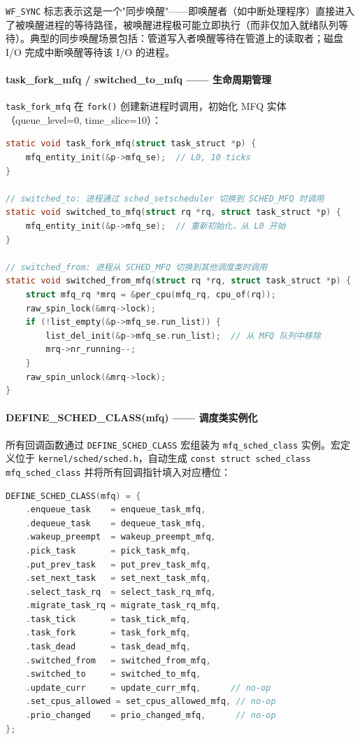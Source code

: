 \documentclass[a4paper]{article}
\begin{document}
\texttt{WF\_SYNC} 标志表示这是一个"同步唤醒"——即唤醒者（如中断处理程序）直接进入了被唤醒进程的等待路径，被唤醒进程极可能立即执行（而非仅加入就绪队列等待）。典型的同步唤醒场景包括：管道写入者唤醒等待在管道上的读取者；磁盘 I/O 完成中断唤醒等待该 I/O 的进程。

\paragraph{task\_fork\_mfq / switched\_to\_mfq —— 生命周期管理}

\texttt{task\_fork\_mfq} 在 \texttt{fork()} 创建新进程时调用，初始化 MFQ 实体（queue\_level=0, time\_slice=10）：

\begin{lstlisting}[language=C, caption={task\_fork / switched\_to / switched\_from（kernel/sched/sched\_mfq.c）}, label={lst:mfq_lifecycle}]
static void task_fork_mfq(struct task_struct *p) {
    mfq_entity_init(&p->mfq_se);  // L0, 10 ticks
}

// switched_to: 进程通过 sched_setscheduler 切换到 SCHED_MFQ 时调用
static void switched_to_mfq(struct rq *rq, struct task_struct *p) {
    mfq_entity_init(&p->mfq_se);  // 重新初始化，从 L0 开始
}

// switched_from: 进程从 SCHED_MFQ 切换到其他调度类时调用
static void switched_from_mfq(struct rq *rq, struct task_struct *p) {
    struct mfq_rq *mrq = &per_cpu(mfq_rq, cpu_of(rq));
    raw_spin_lock(&mrq->lock);
    if (!list_empty(&p->mfq_se.run_list)) {
        list_del_init(&p->mfq_se.run_list);  // 从 MFQ 队列中移除
        mrq->nr_running--;
    }
    raw_spin_unlock(&mrq->lock);
}
\end{lstlisting}

\paragraph{DEFINE\_SCHED\_CLASS(mfq) —— 调度类实例化}

所有回调函数通过 \texttt{DEFINE\_SCHED\_CLASS} 宏组装为 \texttt{mfq\_sched\_class} 实例。宏定义位于 \texttt{kernel/sched/sched.h}，自动生成 \texttt{const struct sched\_class mfq\_sched\_class} 并将所有回调指针填入对应槽位：

\begin{lstlisting}[language=C, caption={DEFINE\_SCHED\_CLASS(mfq) 实例化（kernel/sched/sched\_mfq.c）}, label={lst:mfq_define}]
DEFINE_SCHED_CLASS(mfq) = {
    .enqueue_task    = enqueue_task_mfq,
    .dequeue_task    = dequeue_task_mfq,
    .wakeup_preempt  = wakeup_preempt_mfq,
    .pick_task       = pick_task_mfq,
    .put_prev_task   = put_prev_task_mfq,
    .set_next_task   = set_next_task_mfq,
    .select_task_rq  = select_task_rq_mfq,
    .migrate_task_rq = migrate_task_rq_mfq,
    .task_tick       = task_tick_mfq,
    .task_fork       = task_fork_mfq,
    .task_dead       = task_dead_mfq,
    .switched_from   = switched_from_mfq,
    .switched_to     = switched_to_mfq,
    .update_curr     = update_curr_mfq,      // no-op
    .set_cpus_allowed = set_cpus_allowed_mfq, // no-op
    .prio_changed    = prio_changed_mfq,      // no-op
};
\end{lstlisting}
\end{document}
